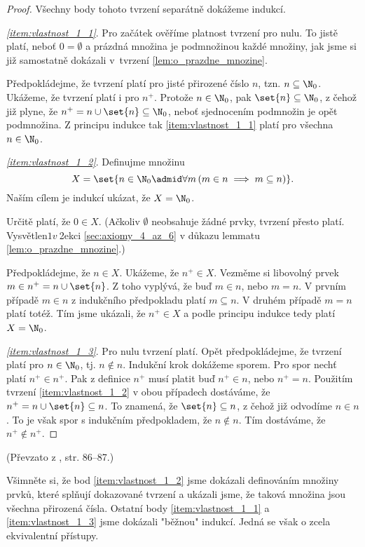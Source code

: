 \begin{proof}
    Všechny body tohoto tvrzení separátně dokážeme indukcí.\par
    \textit{\ref{item:vlastnost_1_1}}. Pro začátek ověříme platnost tvrzení pro nulu. To jistě platí, neboť $0=\emptyset$ a prázdná množina je podmnožinou každé množiny, jak jsme si již samostatně dokázali v~tvrzení \ref{lem:o_prazdne_mnozine}.\par
    Předpokládejme, že tvrzení platí pro jisté přirozené číslo $n$, tzn. $n\subseteq\N_0$. Ukážeme, že tvrzení platí i pro $n^+$. Protože $n\in\N_0$, pak $\set{n}\subseteq\N_0$, z čehož již plyne, že $n^+=n\cup\set{n}\subseteq\N_0$, neboť sjednocením podmnožin je opět podmnožina. Z principu indukce tak \ref{item:vlastnost_1_1} platí pro všechna $n\in\N_0$.\par
    \textit{\ref{item:vlastnost_1_2}}. Definujme množinu
    \begin{equation*}
        X=\set{n\in\N_0\admid \forall m\,(m\in n\implies m\subseteq n)}.
    \end{equation*} 
    Naším cílem je indukcí ukázat, že $X=\N_0$.\par
    Určitě platí, že $0\in X$. (Ačkoliv $\emptyset$ neobsahuje žádné prvky, tvrzení přesto platí. Vysvětlen$1 v~$2ekci \ref{sec:axiomy_4_az_6} v důkazu lemmatu \ref{lem:o_prazdne_mnozine}.)\par
    Předpokládejme, že $n\in X$. Ukážeme, že $n^+\in X$. Vezměme si libovolný prvek $m\in n^+=n\cup\set{n}$. Z toho vyplývá, že buď $m\in n$, nebo $m=n$. V prvním případě $m\in n$ z indukčního předpokladu platí $m\subseteq n$. V druhém případě $m=n$ platí totéž. Tím jsme ukázali, že $n^+\in X$ a podle principu indukce tedy platí $X=\N_0$.\par
    \textit{\ref{item:vlastnost_1_3}}. Pro nulu tvrzení platí. Opět předpokládejme, že tvrzení platí pro $n\in\N_0$, tj. $n\notin n$. Indukční krok dokážeme sporem. Pro spor nechť platí $n^+\in n^+$. Pak z definice $n^+$ musí platit buď $n^+\in n$, nebo $n^+=n$. Použitím tvrzení \ref{item:vlastnost_1_2} v obou případech dostáváme, že $n^+=n\cup\set{n}\subseteq n$. To znamená, že $\set{n}\subseteq n$, z čehož již odvodíme $n\in n$. To je však spor s indukčním předpokladem, že $n\notin n$. Tím dostáváme, že $n^+\notin n^+$.
\end{proof}
(Převzato z \cite{BalcarStepanek1986}, str. 86--87.)\par
Všimněte si, že bod \ref{item:vlastnost_1_2} jsme dokázali definováním množiny prvků, které splňují dokazované tvrzení a ukázali jsme, že taková množina jsou všechna přirozená čísla. Ostatní body \ref{item:vlastnost_1_1} a \ref{item:vlastnost_1_3} jsme dokázali "běžnou" indukcí. Jedná se však o zcela ekvivalentní přístupy.
\medskip


